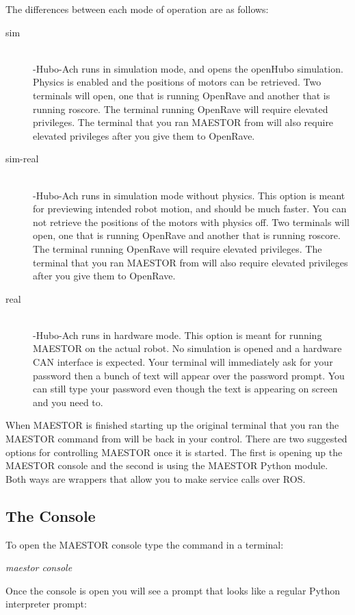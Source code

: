 \documentclass[12pt]{article}
\begin{document}
\noindent The differences between each mode of operation are as follows:
	\begin{description}
		\item[sim] \hfill \\
		-Hubo-Ach runs in simulation mode, and opens the openHubo simulation. Physics is enabled and the positions of motors can be retrieved. Two terminals will open, one that is running OpenRave and another that is running roscore. The terminal running OpenRave will require elevated privileges. The terminal that you ran MAESTOR from will also require elevated privileges after you give them to OpenRave.
		\item[sim-real] \hfill \\
		-Hubo-Ach runs in simulation mode without physics. This option is meant for previewing intended robot motion, and should be much faster. You can not retrieve the positions of the motors with physics off. Two terminals will open, one that is running OpenRave and another that is running roscore. The terminal running OpenRave will require elevated privileges. The terminal that you ran MAESTOR from will also require elevated privileges after you give them to OpenRave.
		\item[real] \hfill \\ 
		-Hubo-Ach runs in hardware mode. This option is meant for running MAESTOR on the actual robot. No simulation is opened and a hardware CAN interface is expected. Your terminal will immediately ask for your password then a bunch of text will appear over the password prompt. You can still type your password even though the text is appearing on screen and you need to. 
	\end{description}
	
\noindent When MAESTOR is finished starting up the original terminal that you ran the MAESTOR command from will be back in your control. There are two suggested options for controlling MAESTOR once it is started. The first is opening up the MAESTOR console and the second is using the MAESTOR Python module. Both ways are wrappers that allow you to make service calls over ROS. 

\subsection{The Console}

To open the MAESTOR console type the command in a terminal:
	\begin{center}
		\textit{maestor console}
	\end{center}
Once the console is open you will see a prompt that looks like a regular Python interpreter prompt:
\end{document}
